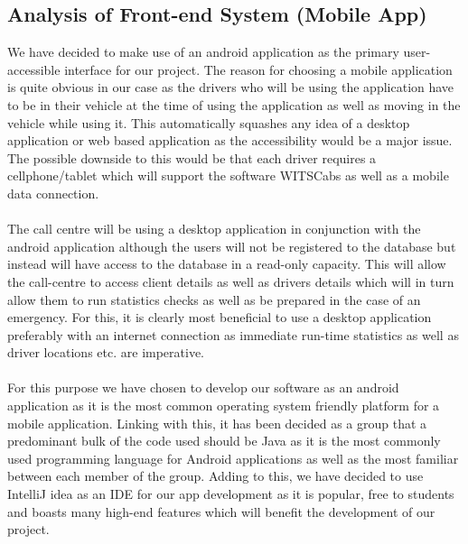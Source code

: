 \documentclass[a4paper,12pt]{article}
\begin{document}
\subsection{Analysis of Front-end System (Mobile App)}
We have decided to make use of an android application as the primary user-accessible interface for our project. The reason for choosing a mobile application is quite obvious in our case as the drivers who will be using the application have to be in their vehicle at the time of using the application as well as moving in the vehicle while using it. This automatically squashes any idea of a desktop application or web based application as the accessibility would be a major issue. The possible downside to this would be that each driver requires a cellphone/tablet which will support the software WITSCabs as well as a mobile data connection. \\\\
The call centre will be using a desktop application in conjunction with the android application although the users will not be registered to the database but instead will have access to the database in a read-only capacity. This will allow the call-centre to access client details as well as drivers details which will in turn allow them to run statistics checks as well as be prepared in the case of an emergency. For this, it is clearly most beneficial to use a desktop application preferably with an internet connection as immediate run-time statistics as well as driver locations etc. are imperative.\\\\
For this purpose we have chosen to develop our software as an android application as it is the most common operating system friendly platform for a mobile application. Linking with this, it has been decided as a group that a predominant bulk of the code used should be Java as it is the most commonly used programming language for Android applications as well as the most familiar between each member of the group. Adding to this, we have decided to use IntelliJ idea as an IDE for our app development as it is popular, free to students and boasts many high-end features which will benefit the development of our project.
\end{document}
